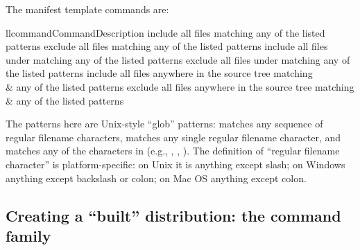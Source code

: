 \documentclass{howto}
\begin{document}
The manifest template commands are:
\begin{tableii}{ll}{command}{Command}{Description}
    {include all files matching any of the listed patterns}
    {exclude all files matching any of the listed patterns}
    {include all files under  matching any of the listed patterns}
    {exclude all files under  matching any of the listed patterns}
    {include all files anywhere in the source tree matching\\&
     any of the listed patterns}
    {exclude all files anywhere in the source tree matching\\&
     any of the listed patterns}
\end{tableii}
The patterns here are Unix-style ``glob'' patterns: \code{*} matches any
sequence of regular filename characters,  matches any single
regular filename character, and  matches any of the
characters in  (e.g., , ,
).  The definition of ``regular filename character'' is
platform-specific: on Unix it is anything except slash; on Windows
anything except backslash or colon; on Mac OS anything except colon.


\subsection{Creating a ``built'' distribution: the
  \protect{} command family}
\label{bdist-cmds}


\subsubsection{\protect{}}

\subsubsection{\protect{}}

\subsubsection{\protect{}}

\subsubsection{\protect{}}
\end{document}
